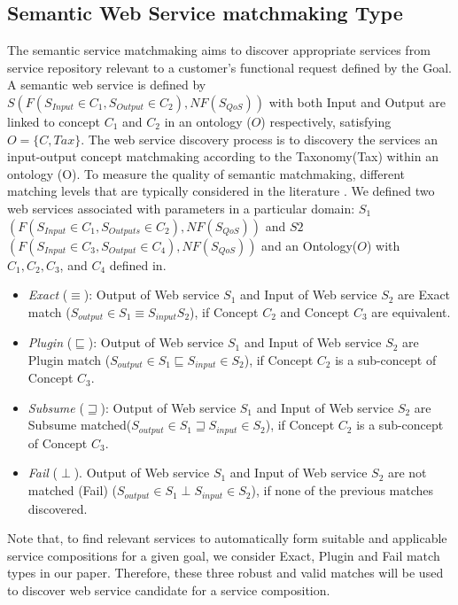 \documentclass{llncs}
\begin{document}
\subsection{Semantic Web Service matchmaking Type}\label{semantic Web service Discovery}
The semantic service matchmaking aims to discover appropriate services from service repository relevant to a customer's functional request defined by the Goal. A semantic web service is defined by $S(F(S_{Input}\in C_{1}, S_{Output}\in C_{2}), NF(S_{QoS}))$ with both Input and Output are linked to concept $C_{1}$ and $C_{2}$ in an ontology ($O$) respectively, satisfying $O=\{C, Tax\}$. The web service discovery process is to discovery the services an input-output concept matchmaking according to the Taxonomy(Tax) within an ontology (O). To measure the quality of semantic matchmaking, different matching levels that are typically considered in the literature \cite{paolucci2002semantic}. We defined two web services associated with parameters in a particular domain: $S_{1}$ $(F(S_{Input}\in C_{1}, S_{Outputs}\in C_{2}), NF(S_{QoS}))$ and  $S2$ $(F(S_{Input}\in C_{3}, S_{Output}\in C_{4}), NF(S_{QoS}))$ and an Ontology($O$) with $C_{1},C_{2},C_{3}$, and $C_{4}$ defined in. 

\begin{itemize}
\item \textit{Exact} ($\equiv$): Output of Web service $S_{1}$ and Input of Web service $S_{2}$ are Exact match ($ S_{output} \in S_{1} \equiv S_{input}S_{2}$), if  Concept $C_{2}$ and Concept $C_{3}$ are equivalent.
\item \textit{Plugin} ($\sqsubseteq$): Output of Web service $S_{1}$ and Input of Web service $S_{2}$ are Plugin match ($S_{output} \in S_{1} \sqsubseteq S_{input} \in S_{2}$), if  Concept $C_{2}$ is a sub-concept of Concept $C_{3}$.
\item \textit{Subsume} ($\sqsupseteq$): Output of Web service $S_{1}$ and Input of Web service $S_{2}$ are Subsume matched($S_{output} \in S_{1} \sqsupseteq S_{input} \in S_{2}$), if  Concept $C_{2}$ is a sub-concept of  Concept $C_{3}$.
\item \textit{Fail} ($\perp$). Output of Web service $S_{1}$ and Input of Web service $S_{2}$ are not matched (Fail) ($S_{output} \in S_{1} \perp S_{input} \in S_{2}$), if none of the previous matches discovered.
\end{itemize}

Note that, to find relevant services to automatically form suitable and applicable service compositions for a given goal, we consider Exact, Plugin and Fail match types in our paper. Therefore, these three robust and valid matches will be used to discover web service candidate for a service composition. 
\end{document}
